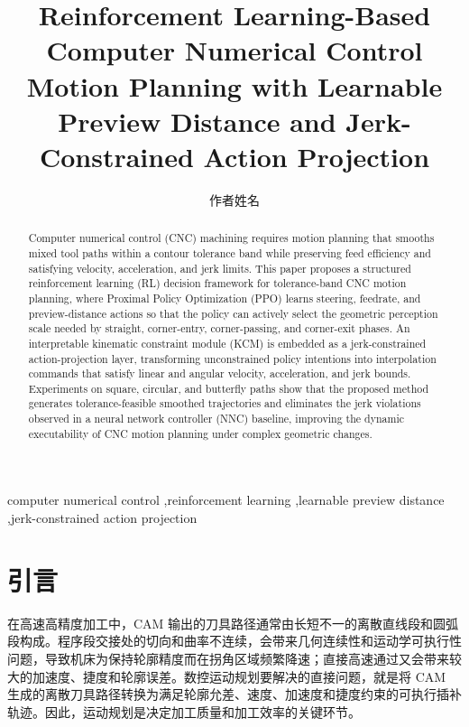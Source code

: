 \documentclass[preprint,12pt]{elsarticle}
\begin{document}
\begin{frontmatter}

\title{Reinforcement Learning-Based Computer Numerical Control Motion Planning with Learnable Preview Distance and Jerk-Constrained Action Projection}

\author[1]{作者姓名}

\begin{abstract}
Computer numerical control (CNC) machining requires motion planning that smooths mixed tool paths within a contour tolerance band while preserving feed efficiency and satisfying velocity, acceleration, and jerk limits. This paper proposes a structured reinforcement learning (RL) decision framework for tolerance-band CNC motion planning, where Proximal Policy Optimization (PPO) learns steering, feedrate, and preview-distance actions so that the policy can actively select the geometric perception scale needed by straight, corner-entry, corner-passing, and corner-exit phases. An interpretable kinematic constraint module (KCM) is embedded as a jerk-constrained action-projection layer, transforming unconstrained policy intentions into interpolation commands that satisfy linear and angular velocity, acceleration, and jerk bounds. Experiments on square, circular, and butterfly paths show that the proposed method generates tolerance-feasible smoothed trajectories and eliminates the jerk violations observed in a neural network controller (NNC) baseline, improving the dynamic executability of CNC motion planning under complex geometric changes.
\end{abstract}

\begin{keyword}
computer numerical control \sep reinforcement learning \sep learnable preview distance \sep jerk-constrained action projection
\end{keyword}

\end{frontmatter}

\section{引言}
\label{sec:intro}

在高速高精度加工中，CAM 输出的刀具路径通常由长短不一的离散直线段和圆弧段构成。程序段交接处的切向和曲率不连续，会带来几何连续性和运动学可执行性问题，导致机床为保持轮廓精度而在拐角区域频繁降速；直接高速通过又会带来较大的加速度、捷度和轮廓误差。数控运动规划要解决的直接问题，就是将 CAM 生成的离散刀具路径转换为满足轮廓允差、速度、加速度和捷度约束的可执行插补轨迹。因此，运动规划是决定加工质量和加工效率的关键环节。
\end{document}
